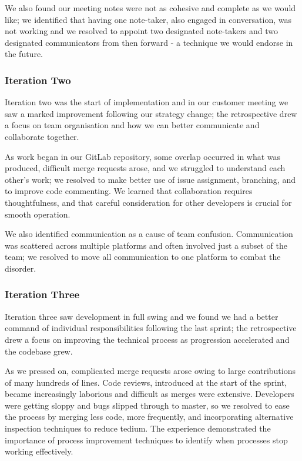 \documentclass{l3proj}
\begin{document}
We also found our meeting notes were not as cohesive and complete as we would like; we identified that having one note-taker, also engaged in conversation, was not working and we resolved to appoint two designated note-takers and two designated communicators from then forward - a technique we would endorse in the future. 


\subsubsection{Iteration Two} \label{sec:3.4.3}
Iteration two was the start of implementation and in our customer meeting we saw a marked improvement following our strategy change; the retrospective drew a focus on team organisation and how we can better communicate and collaborate together.

As work began in our GitLab repository, some overlap occurred in what was produced, difficult merge requests arose, and we struggled to understand each other's work; we resolved to make better use of issue assignment, branching, and to improve code commenting. We learned that collaboration requires thoughtfulness, and that careful consideration for other developers is crucial for smooth operation.

We also identified communication as a cause of team confusion. Communication was scattered across multiple platforms and often involved just a subset of the team; we resolved to move all communication to one platform to combat the disorder.


\subsubsection{Iteration Three} \label{sec:3.4.4}
Iteration three saw development in full swing and we found we had a better command of individual responsibilities following the last sprint; the retrospective drew a focus on improving the technical process as progression accelerated and the codebase grew.

As we pressed on, complicated merge requests arose owing to large contributions of many hundreds of lines. Code reviews, introduced at the start of the sprint, became increasingly laborious and difficult as merges were extensive. Developers were getting sloppy and bugs slipped through to master, so we resolved to ease the process by merging less code, more frequently, and incorporating alternative inspection techniques to reduce tedium. The experience demonstrated the importance of process improvement techniques to identify when processes stop working effectively.
\end{document}
